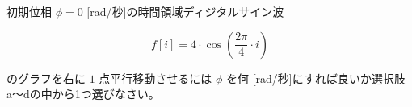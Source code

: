 初期位相 $\phi = 0$ [rad/秒]の時間領域ディジタルサイン波 

\[
f[i] = 4 \cdot \cos \left ( \frac{2 \pi}{4}  \cdot i \right )
\]

\noindent のグラフを右に $1$ 点平行移動させるには $\phi$ を何 [rad/秒]にすれば良いか選択肢a〜dの中から1つ選びなさい。
